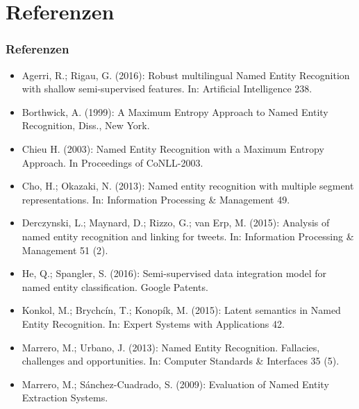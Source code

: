 \documentclass{beamer}
\begin{document}
\section{Referenzen}
	\begin{frame}
		\frametitle{Referenzen}
		\begin{itemize}
			\item Agerri, R.; Rigau, G. (2016): Robust multilingual Named Entity Recognition with shallow semi-supervised features. In: Artificial Intelligence 238.\\
			\item Borthwick, A. (1999): A
				Maximum Entropy Approach to Named Entity Recognition, Diss., New York.\\
			\item Chieu H. (2003): Named Entity Recognition with a Maximum Entropy Approach. In Proceedings of CoNLL-2003.
			\item Cho, H.; Okazaki, N. (2013): Named entity recognition with multiple segment representations. In: Information Processing \& Management 49.\\
			\item Derczynski, L.; Maynard, D.; Rizzo, G.; van Erp, M. (2015): Analysis of named entity recognition and linking for tweets. In: Information Processing \& Management 51 (2).\\
		\end{itemize}
	\end{frame}
	\begin{frame}
		\begin{itemize}
			\item He, Q.; Spangler, S. (2016): Semi-supervised data integration model for named entity classification. Google Patents.
			\item Konkol, M.; Brychcín, T.; Konopík, M. (2015): Latent semantics in Named Entity Recognition. In: Expert Systems with Applications 42.\\
						
			\item Marrero, M.; Urbano, J. (2013): Named Entity Recognition. Fallacies, challenges and opportunities. In: Computer Standards \& Interfaces 35 (5).\\
			\item Marrero, M.; Sánchez-Cuadrado, S. (2009): Evaluation of Named Entity Extraction Systems.\\
		\end{itemize}
	\end{frame}
\end{document}
